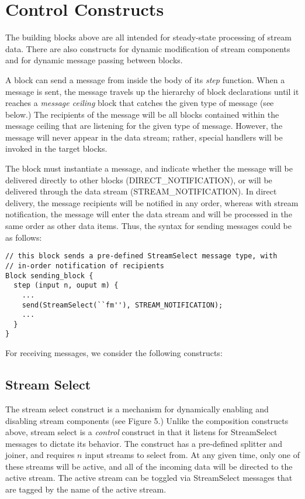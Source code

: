 \section{Control Constructs}

The building blocks above are all intended for steady-state processing
of stream data.  There are also constructs for dynamic modification of
stream components and for dynamic message passing between blocks.  

A block can send a message from inside the body of its {\em step}
function.  When a message is sent, the message travels up the hierarchy
of block declarations until it reaches a {\em message ceiling} block
that catches the given type of message (see below.)  The recipients of
the message will be all blocks contained within the message ceiling that
are listening for the given type of message.  However, the message will
never appear in the data stream; rather, special handlers will be
invoked in the target blocks.

The block must instantiate a message, and indicate whether the message
will be delivered directly to other blocks (DIRECT\_NOTIFICATION), or
will be delivered through the data stream (STREAM\_NOTIFICATION).  In
direct delivery, the message recipients will be notified in any order,
whereas with stream notification, the message will enter the data stream
and will be processed in the same order as other data items.  Thus, the
syntax for sending messages could be as follows:

\begin{verbatim}
// this block sends a pre-defined StreamSelect message type, with
// in-order notification of recipients
Block sending_block {
  step (input n, ouput m) {
    ...
    send(StreamSelect(``fm''), STREAM_NOTIFICATION);
    ...
  }
}
\end{verbatim}

For receiving messages, we consider the following constructs:

\subsection{Stream Select}

The stream select construct is a mechanism for dynamically enabling and
disabling stream components (see Figure 5.)  Unlike the composition
constructs above, stream select is a {\em control} construct in that it
listens for StreamSelect messages to dictate its behavior.  The
construct has a pre-defined splitter and joiner, and requires $n$ input
streams to select from.  At any given time, only one of these streams
will be active, and all of the incoming data will be directed to the
active stream.  The active stream can be toggled via StreamSelect
messages that are tagged by the name of the active stream.

